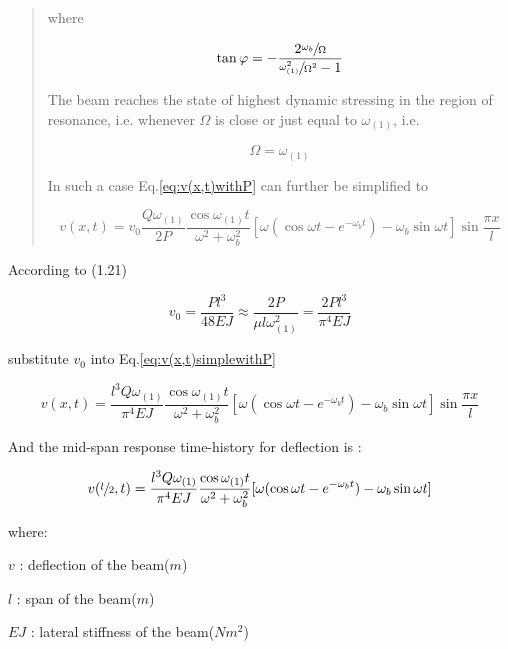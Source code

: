 \begin{quote}
where

\begin{equation}
    \tan \varphi = -\frac{2\sfrac{\omega_b}{\Omega}}{\sfrac{\omega_{(1)}^2}{\Omega^2}-1}
\end{equation}

The beam reaches the state of highest dynamic stressing in the region of resonance, i.e. whenever $\Omega$ is close or just equal to $\omega_{(1)}$, i.e.

\begin{equation}
    \Omega = \omega_{(1)}
\end{equation}

In such a case Eq.\ref{eq:v(x,t)withP} can further be simplified to 

\begin{equation}\label{eq:v(x,t)simplewithP}
    v(x,t) = v_0 \frac{Q\omega_{(1)}}{2P}\frac{\cos \omega_{(1)}t}{\omega^2+\omega_b^2}[\omega(\cos\omega t - e^{-\omega_b t})-\omega_b\sin\omega t]\sin\frac{\pi x}{l}
\end{equation}

\end{quote}

According to (1.21)

\begin{equation}
    v_0 = \frac{Pl^3}{48EJ} \approx \frac{2P}{\mu l \omega_{(1)}^2} = \frac{2Pl^3}{\pi ^4 EJ}
\end{equation}

substitute $v_0$ into Eq.\ref{eq:v(x,t)simplewithP}

\begin{equation}
    v(x,t) = \frac{l^3Q\omega_{(1)}}{\pi^4 EJ}\frac{\cos \omega_{(1)}t}{\omega^2+\omega_b^2}[\omega(\cos\omega t - e^{-\omega_b t})-\omega_b\sin\omega t]\sin\frac{\pi x}{l}
\end{equation}

And the mid-span response time-history for deflection is :

\begin{equation}\label{eq:v(x,t)simpleharmonic}
    v(\sfrac{l}{2},t) = \frac{l^3Q\omega_{(1)}}{\pi^4 EJ}\frac{\cos \omega_{(1)}t}{\omega^2+\omega_b^2}[\omega(\cos\omega t - e^{-\omega_b t})-\omega_b\sin\omega t]
\end{equation}

where:

$v$ : deflection of the beam($m$)

$l$ : span of the beam($m$)

$EJ$ : lateral stiffness of the beam($Nm^2$)


